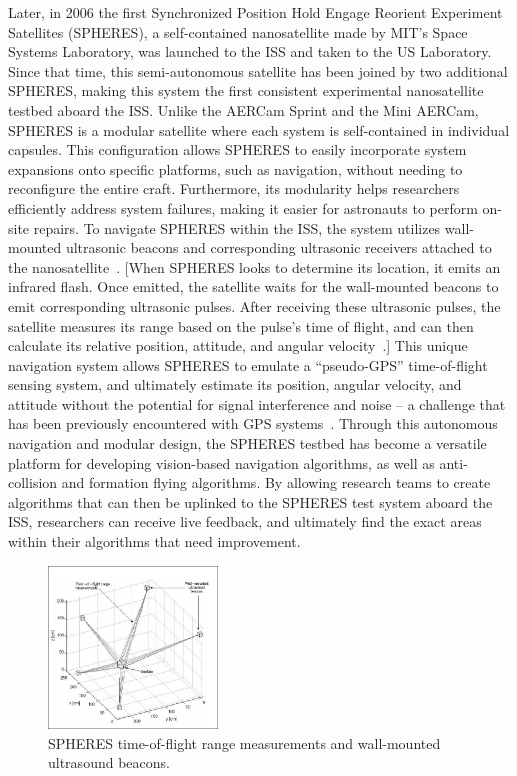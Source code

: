 \documentclass[journal, 10pt]{IEEEtran}
\begin{document}
Later, in 2006 the first Synchronized Position Hold Engage Reorient Experiment Satellites (SPHERES), a self-contained nanosatellite made by MIT's Space Systems Laboratory, was launched to the ISS and taken to the US Laboratory. Since that time, this semi-autonomous satellite has been joined by two additional SPHERES, making this system the first consistent experimental nanosatellite testbed aboard the ISS. Unlike the AERCam Sprint and the Mini AERCam, SPHERES is a modular satellite where each system is self-contained in individual capsules. This configuration allows SPHERES to easily incorporate system expansions onto specific platforms, such as navigation, without needing to reconfigure the entire craft. Furthermore, its modularity helps researchers efficiently address system failures, making it easier for astronauts to perform on-site repairs. To navigate SPHERES within the ISS, the system utilizes wall-mounted ultrasonic beacons and corresponding ultrasonic receivers attached to the nanosatellite~\cite{SPHERES}. [When SPHERES looks to determine its location, it emits an infrared flash. Once emitted, the satellite waits for the wall-mounted beacons to emit corresponding ultrasonic pulses. After receiving these ultrasonic pulses, the satellite measures its range based on the pulse's time of flight, and can then calculate its relative position, attitude, and angular velocity~\cite{SPHERES, Vertigo1}.] This unique navigation system allows SPHERES to emulate a ``pseudo-GPS'' time-of-flight sensing system, and ultimately estimate its position, angular velocity, and attitude without the potential for signal interference and noise -- a challenge that has been previously encountered with GPS systems~\cite{Vertigo1}. Through this autonomous navigation and modular design, the SPHERES testbed has become a versatile platform for developing vision-based navigation algorithms, as well as anti-collision and formation flying algorithms. By allowing research teams to create algorithms that can then be uplinked to the SPHERES test system aboard the ISS, researchers can receive live feedback, and ultimately find the exact areas within their algorithms that need improvement.

\begin{figure}[tb]
\begin{center}
\includegraphics[width=0.4\textwidth]{figures/Spheres_Auto10.pdf}
\caption{SPHERES time-of-flight range measurements and wall-mounted ultrasound beacons.}
\label{spheres_plot}
\end{center}
\end{figure}
\end{document}
